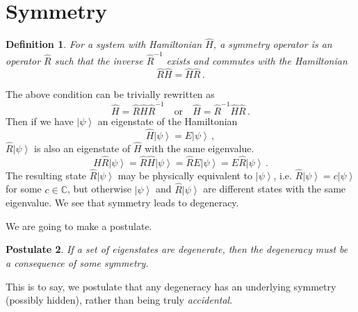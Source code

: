 \documentclass{article}
\theoremstyle{plain}\theoremheaderfont{\normalfont\itshape}\theorembodyfont{\rmfamily}\theoremseparator{.}\newtheorem*{rem}{Remark}\newtheorem*{ex}{Example}\newtheorem*{proof}{Proof}\newtheorem*{altp}{Alternative proof}
\theoremstyle{plain}\theoremheaderfont{\normalfont\bfseries}\theorembodyfont{\rmfamily}\theoremseparator{.}\newtheorem{thm}{Theorem}[section]\newtheorem{lem}[thm]{Lemma}\newtheorem{prop}[thm]{Proposition}\newtheorem*{cor}{Corollary}\newtheorem{defn}[thm]{Definition}\newtheorem{clm}[thm]{Claim}\newtheorem{clminproof}{Claim}\newtheorem*{law}{Law}\newtheorem{pos}[thm]{Postulate}
\theoremstyle{break}\theoremheaderfont{\normalfont\itshape}\theorembodyfont{\rmfamily}\theoremseparator{.\medskip}\newtheorem*{proofskip}{Proof}\newtheorem*{exs}{Examples}\newtheorem*{rems}{Remarks}
\theoremstyle{break}\theoremheaderfont{\normalfont\bfseries}\theorembodyfont{\rmfamily}\theoremseparator{.\medskip}\newtheorem{lemskip}[thm]{Lemma}\newtheorem{defnskip}[thm]{Definition}\newtheorem{propskip}[thm]{Proposition}\newtheorem{thmskip}[thm]{Theorem}
\numberwithin{equation}{section}
\newcommand{\ket}[1]{\left| #1 \right\rangle}
\newcommand{\CC}{\mathbb{C}}
\begin{document}
    \section{Symmetry}
    \begin{defn}
        For a system with Hamiltonian \(\hat{H}\), a \textit{symmetry operator} is an operator \(\hat{R}\) such that the inverse \(\hat{R}^{-1}\) exists and commutes with the Hamiltonian
        \begin{equation}
            \hat{R}\hat{H}=\hat{H}\hat{R}\,.
        \end{equation}
    \end{defn}
    The above condition can be trivially rewritten as
    \begin{equation}
        \hat{H}=\hat{R}\hat{H}\hat{R}^{-1}\quad\text{or}\quad\hat{H}=\hat{R}^{-1}\hat{H}\hat{R}\,.
    \end{equation}
    Then if we have \(\ket{\psi}\) an eigenstate of the Hamiltonian
    \begin{equation}
        \hat{H}\ket{\psi}=E\ket{\psi}\,,
    \end{equation}
    \(\hat{R}\ket{\psi}\) is also an eigenstate of \(\hat{H}\) with the same eigenvalue.
    \begin{equation}
        \hat{H}\hat{R}\ket{\psi}=\hat{R}\hat{H}\ket{\psi}=\hat{R}E\ket{\psi}=E\hat{R}\ket{\psi}\,.
    \end{equation}
    The resulting state \(\hat{R}\ket{\psi}\) may be physically equivalent to \(\ket{\psi}\), i.e. \(\hat{R}\ket{\psi}=c\ket{\psi}\) for some \(c\in\CC\), but otherwise \(\ket{\psi}\) and \(\hat{R}\ket{\psi}\) are different states with the same eigenvalue. We see that symmetry leads to degeneracy.

    We are going to make a postulate.
    \begin{pos}
        If a set of eigenstates are degenerate, then the degeneracy must be a consequence of some symmetry.
    \end{pos}
    This is to say, we postulate that any degeneracy has an underlying symmetry (possibly hidden), rather than being truly \textit{accidental}.
\end{document}
